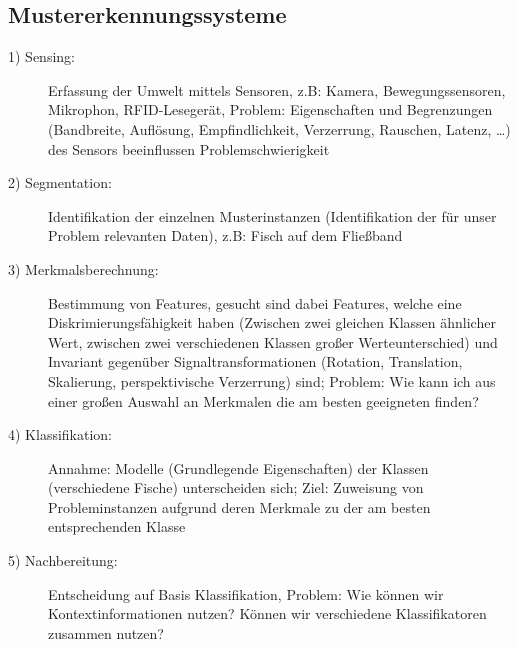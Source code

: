 \documentclass{article} %
\begin{document}
	\subsection{Mustererkennungssysteme}
		\begin{description}
			\item[1) Sensing:] Erfassung der Umwelt mittels Sensoren, z.B: Kamera, Bewegungssensoren, Mikrophon, RFID-Lesegerät, Problem: Eigenschaften und Begrenzungen (Bandbreite, Auflösung, Empfindlichkeit, Verzerrung, Rauschen, Latenz, \dots) des Sensors beeinflussen Problemschwierigkeit 			
			\item[2) Segmentation:] Identifikation der einzelnen Musterinstanzen (Identifikation der für unser Problem relevanten Daten), z.B: Fisch auf dem Fließband
			\item[3) Merkmalsberechnung:] Bestimmung von Features, gesucht sind dabei Features, welche eine Diskrimierungsfähigkeit haben (Zwischen zwei gleichen Klassen ähnlicher Wert, zwischen zwei verschiedenen Klassen großer Werteunterschied) und Invariant gegenüber Signaltransformationen (Rotation, Translation, Skalierung, perspektivische Verzerrung) sind; Problem: Wie kann ich aus einer großen Auswahl an Merkmalen die am besten geeigneten finden?
			\item[4) Klassifikation:] Annahme: Modelle (Grundlegende Eigenschaften) der Klassen (verschiedene Fische) unterscheiden sich; Ziel: Zuweisung von Probleminstanzen aufgrund deren Merkmale zu der am besten entsprechenden Klasse			
			\item[5) Nachbereitung:] Entscheidung auf Basis Klassifikation, Problem: Wie können wir Kontextinformationen nutzen? Können wir verschiedene Klassifikatoren zusammen nutzen? 
		\end{description}
	
\end{document}
